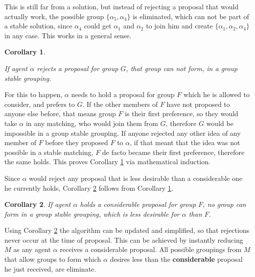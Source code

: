 \documentclass{elsarticle}
\newtheorem{mysta}{Corollary}
\begin{document}
This is still far from a solution, but instead of rejecting a proposal that would actually work, the possible group $ \{ \alpha_5 , \alpha_4 \}$ is eliminated, which can not be part of a stable solution, since $\alpha_4$ could get $\alpha_1$ and $\alpha_2$ to join him and create $\{ \alpha_1 , \alpha_2 , \alpha_4 \}$ in any case. This works in a general sense.

\begin{mysta}
\label{sta:rej}

If agent $\alpha$ rejects a proposal for group $G$, that group can not form, in a group stable grouping.

\end{mysta}

For this to happen, $\alpha$ needs to hold a proposal for group $F$ which he is allowed to consider, and prefers to $G$. If the other members of $F$ have not proposed to anyone else before, that means group $F$ is their first preference, so they would take $\alpha$ in any matching, who would join them from $G$, therefore $G$ would be impossible in a group stable grouping. If anyone rejected any other idea of any member of $F$ before they proposed $F$ to $\alpha$, if that meant that the idea was not possible in a stable matching, $F$ de facto became their first preference, therefore the same holds. This proves Corollary \ref{sta:rej} via mathematical induction.

Since $\alpha$ would reject any proposal that is less desirable than a considerable one he currently holds, Corollary \ref{sta:hold} follows from Corollary \ref{sta:rej}.

\begin{mysta}
\label{sta:hold}
If agent $\alpha$ holds a considerable proposal for group $F$, no group can form in a group stable grouping, which is less desirable for $\alpha$ than $F$.
\end{mysta}

Using Corollary \ref{sta:hold} the algorithm can be updated and simplified, so that rejections never occur at the time of proposal. This can be achieved by instantly reducing $M$ as any agent $\alpha$ receives a considerable proposal. All possible groupings from $M$ that allow groups to form which $\alpha$ desires less than the \textbf{considerable} proposal he just received, are eliminate.
\end{document}
